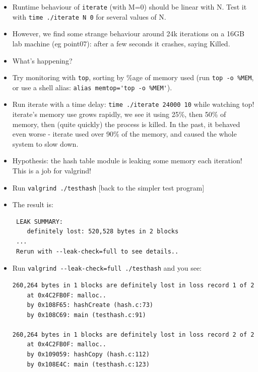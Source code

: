 \documentclass[handout]{beamer}
\newcommand{\pitem}{\pause \item}
\begin{document}
\begin{frame}[fragile]
    \begin{itemize}

    \item
      Runtime behaviour of \verb+iterate+ (with M=0) \alert{should be linear with N}.
      Test it with \verb+time ./iterate N 0+ for several values of N.
    \pitem
      However, we find \alert{some strange behaviour} around 24k
      iterations on a 16GB lab machine (eg point07):
      \pause
      after a few seconds it crashes, saying \alert{Killed}.
    \item
      What's happening?
    \pitem
      Try monitoring with \verb+top+, sorting by \%age of memory used (run \verb+top -o %MEM+, or use a shell alias: \verb+alias memtop='top -o %MEM'+).
    \pause
    \item
      Run iterate with a time delay: \verb+time ./iterate 24000 10+
      while watching top!
      \pause
      iterate's memory use
      \alert{grows rapidly}, we see it using 25\%, then 50\% of memory,
      then (quite quickly) \alert{the process is killed}.
      In the past, it behaved even worse - iterate used \alert{over 90\%}
      of the memory, and caused the whole system to slow down.
    \pitem
      Hypothesis: the hash table module is leaking some memory each iteration!
      \pause
      This is a job for valgrind!
    \end{itemize}
\end{frame}

\begin{frame}[fragile]
    \begin{itemize}
    \item
      Run \verb+valgrind ./testhash+ [back to the simpler test program]
    \pitem
      The result is:
\begin{verbatim}
 LEAK SUMMARY:
    definitely lost: 520,528 bytes in 2 blocks
 ...
 Rerun with --leak-check=full to see details..
\end{verbatim}
    \pause
    \item
      Run \verb+valgrind --leak-check=full ./testhash+ and you see:

\begin{verbatim}
260,264 bytes in 1 blocks are definitely lost in loss record 1 of 2
    at 0x4C2FB0F: malloc..
    by 0x108F65: hashCreate (hash.c:73)
    by 0x108C69: main (testhash.c:91)
 
260,264 bytes in 1 blocks are definitely lost in loss record 2 of 2
    at 0x4C2FB0F: malloc..
    by 0x109059: hashCopy (hash.c:112)
    by 0x108E4C: main (testhash.c:123)
\end{verbatim}

  \end{itemize}
\end{frame}
\end{document}
